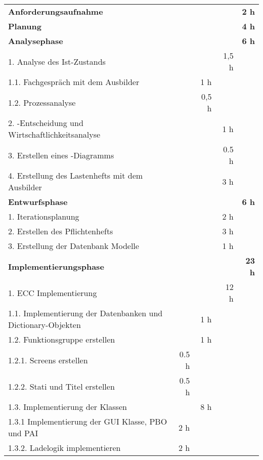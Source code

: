 \begin{tabu}{lrrrr}
\rowfont{\bfseries\leavevmode\color{headingfont}}\textbf{Anforderungsaufnahme} & \textbf{} & \textbf{} & \textbf{} & \textbf{2 h} \\
\rowfont{\bfseries\leavevmode\color{headingfont}}\textbf{Planung} & \textbf{} & \textbf{} & \textbf{} & \textbf{4 h} \\
\rowfont{\bfseries\leavevmode\color{headingfont}}\textbf{Analysephase} & \textbf{} & \textbf{} & \textbf{} & \textbf{6 h} \\
1. Analyse des Ist-Zustands & & & 1,5 h & \\
1.1. Fachgespräch mit dem Ausbilder & & 1 h & & \\
1.2. Prozessanalyse & & 0,5 h & & \\
2. -Entscheidung und Wirtschaftlichkeitsanalyse & &       & 1 h   &  \\
3. Erstellen eines -Diagramms & & & 0.5 h & \\
4. Erstellung des Lastenhefts mit dem Ausbilder & & & 3 h & \\
\rowfont{\color{headingfont}}\textbf{Entwurfsphase} & \textbf{} & \textbf{} & \textbf{} & \textbf{6 h} \\
1. Iterationsplanung & & & 2 h & \\
2. Erstellen des Pflichtenhefts & & & 3 h & \\
3. Erstellung der Datenbank Modelle & & & 1 h & \\
\rowfont{\color{headingfont}}\textbf{Implementierungsphase} & \textbf{} & \textbf{} & \textbf{} & \textbf{23 h} \\
1. ECC Implementierung & & & 12 h & \\
1.1. Implementierung der Datenbanken und Dictionary-Objekten & & 1 h & & \\
1.2. Funktionsgruppe erstellen & & 1 h & \\
1.2.1. Screens erstellen & 0.5 h & & & \\
1.2.2. Stati und Titel erstellen & 0.5 h & & & \\
1.3. Implementierung der Klassen & & 8 h & & \\
1.3.1 Implementierung der GUI Klasse, PBO und PAI & 2 h & & & \\
1.3.2. Ladelogik implementieren & 2 h & & & \\

\end{tabu}
